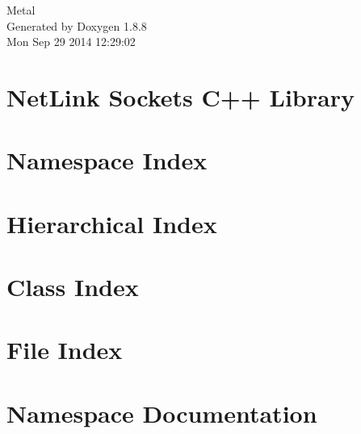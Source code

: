 \documentclass[twoside]{book}
\newcommand{\+}{\discretionary{\mbox{\scriptsize$\hookleftarrow$}}{}{}}
\newcommand{\clearemptydoublepage}{%
  \newpage{\pagestyle{empty}\cleardoublepage}%
}
\begin{document}
\hypersetup{pageanchor=false,
             bookmarks=true,
             bookmarksnumbered=true,
             pdfencoding=unicode
            }
\begin{titlepage}
\vspace*{7cm}
\begin{center}%
{\Large Metal }\\
\vspace*{1cm}
{\large Generated by Doxygen 1.8.8}\\
\vspace*{0.5cm}
{\small Mon Sep 29 2014 12:29:02}\\
\end{center}
\end{titlepage}
\clearemptydoublepage
\tableofcontents
\clearemptydoublepage
{}
\hypersetup{pageanchor=true}

\chapter{Net\+Link Sockets C++ Library}
\label{index}\hypertarget{index}{}
\chapter{Namespace Index}

\chapter{Hierarchical Index}

\chapter{Class Index}

\chapter{File Index}

\chapter{Namespace Documentation}

\end{document}

